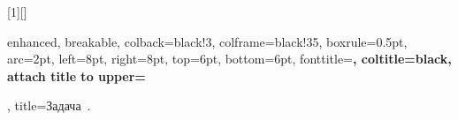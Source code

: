 
[1][]{%
  enhanced, breakable,
  colback=black!3, colframe=black!35, boxrule=0.5pt, arc=2pt,
  left=8pt, right=8pt, top=6pt, bottom=6pt,
  fonttitle=\bfseries, coltitle=black,
  attach title to upper={\par\smallskip},
  title={Задача~\thetcbcounter.}}

\newenvironment{solutionenv}
  {\par\medskip\noindent{\itshape Решение.}\par\nobreak\smallskip}
  {\par\medskip}

\makeatletter
\newcommand{\resetproblems}{\setcounter{tcb@cnt@problembox}{0}}
\makeatother
